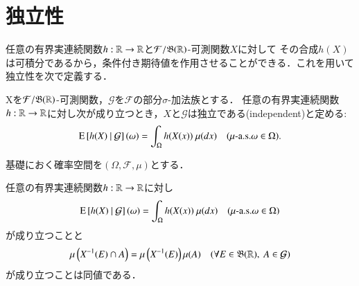 \section{独立性}
	任意の有界実連続関数$h:\mathbb{R} \rightarrow \mathbb{R}$と$\mathcal{F}/\mathfrak{B}(\mathbb{R})$-可測関数$X$に対して
	その合成$h(X)$は可積分であるから，条件付き期待値を作用させることができる．これを用いて独立性を次で定義する．
	
	\begin{screen}
		\begin{dfn}[独立性]
			Xを$\mathcal{F}/\mathfrak{B}(\mathbb{R})$-可測関数，$\mathcal{G}$を$\mathcal{F}$の部分$\sigma$-加法族とする．
			任意の有界実連続関数$h:\mathbb{R} \rightarrow \mathbb{R}$に対し次が成り立つとき，$X$と$\mathcal{G}$は独立である(independent)と定める:
			\begin{align}
				\cexp{h(X)}{\mathcal{G}}(\omega) = \int_\Omega h(X(x))\ \mu(dx)
				\quad (\mbox{$\mu$-a.s.}\omega \in \Omega).
			\end{align}
		\end{dfn}
	\end{screen}

\newpage
	基礎におく確率空間を$(\Omega,\mathcal{F},\mu)$とする．
	\begin{screen}
		\begin{thm}[独立性の同値条件]
			任意の有界実連続関数$h:\mathbb{R} \rightarrow \mathbb{R}$に対し
			\begin{align}
				\cexp{h(X)}{\mathcal{G}}(\omega) = \int_\Omega h(X(x))\ \mu(dx)
				\quad (\mbox{$\mu$-a.s.}\omega \in \Omega)
				\label{eq:prp_equivalent_condition_of_independence_1}
			\end{align}
			が成り立つことと
			\begin{align}
				\mu\left( X^{-1}(E) \cap A \right) = \mu\left( X^{-1}(E) \right)\mu(A) \quad (\forall E \in \mathfrak{B}(\mathbb{R}),\ A \in \mathcal{G})
				\label{eq:prp_equivalent_condition_of_independence_2}
			\end{align}
			が成り立つことは同値である．
			\label{prp:equivalent_condition_of_independence}
		\end{thm}
	\end{screen}
	
